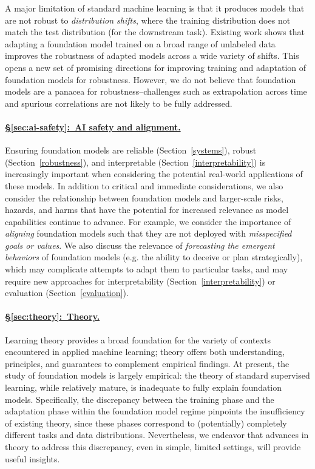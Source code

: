 A major limitation of standard machine learning is that it produces models that are not robust to \emph{distribution shifts}, where the training distribution does not match the test distribution (for the downstream task). Existing work shows that adapting a foundation model trained on a broad range of unlabeled data improves the robustness of adapted models across a wide variety of shifts. This opens a new set of promising directions for improving training and adaptation of foundation models for robustness. However, we do not believe that foundation models are a panacea for robustness--challenges such as extrapolation across time and spurious correlations are not likely to be fully addressed. 

\paragraph{\hyperref[sec:ai-safety]{§\ref{sec:ai-safety}:~AI safety and alignment.}}

Ensuring foundation models are reliable (Section~\ref{systems}), robust (Section~\ref{robustness}), and interpretable (Section~\ref{interpretability}) is increasingly important when considering the potential real-world applications of these models. In addition to critical and immediate considerations, we also consider the relationship between foundation models and larger-scale risks, hazards, and harms that have the potential for increased relevance as model capabilities continue to advance. For example, we consider the importance of \textit{aligning} foundation models such that they are not deployed with \textit{misspecified goals or values}. We also discuss the relevance of \textit{forecasting the emergent behaviors} of foundation models (e.g. the ability to deceive or plan strategically), which may complicate attempts to adapt them to particular tasks, and may require new approaches for interpretability (Section~\ref{interpretability}) or evaluation (Section~\ref{evaluation}).

\paragraph{\hyperref[sec:theory]{§\ref{sec:theory}:~Theory.}}

Learning theory provides a broad foundation for the variety of contexts encountered in applied machine learning; theory offers both understanding, principles, and guarantees to complement empirical findings. At present, the study of foundation models is largely empirical: the theory of standard supervised learning, while relatively mature, is inadequate to fully explain foundation models. Specifically, the discrepancy between the training phase and the adaptation phase within the foundation model regime pinpoints the insufficiency of existing theory, since these phases correspond to (potentially) completely different tasks and data distributions. Nevertheless, we endeavor that advances in theory to address this discrepancy, even in simple, limited settings, will provide useful insights. 

